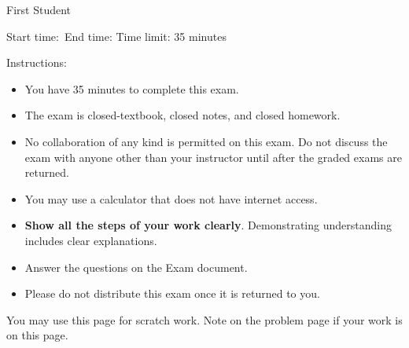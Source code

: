 \documentclass[main.tex,14pt]{subfiles}
\begin{document}
\setcounter{page}{0}
\thispagestyle{empty}

{\Large First Student}%

{Start time:\hrulefill\ End time: \hrulefill}
Time limit: 35 minutes

\vspace{1cm}
{\Large Instructions:}
\begin{itemize}

 \item You have 35 minutes to complete this exam.

 \item The exam is closed-textbook, closed notes, and closed homework. 
 
 \item No collaboration of any kind is permitted on this exam. Do not discuss the exam with anyone other than your instructor until after the graded exams are returned.
 
 \item You may use a calculator that does not have internet access. 

 \item \textbf{Show all the steps of your work clearly}. Demonstrating understanding includes clear explanations.
 
\item Answer the questions on the Exam document. 


\item Please do not distribute this exam once it is returned to you.



 \end{itemize}


\afterpage{\blankpage}

\clearpage


 \begin{questions}


 \question 

 \question 

 \question 
 
 
\end{questions}

You may use this page for scratch work. Note on the problem page if your work is on this page.
\thispagestyle{empty}
\hbox{}


\checkoddpage{}
\end{document}
